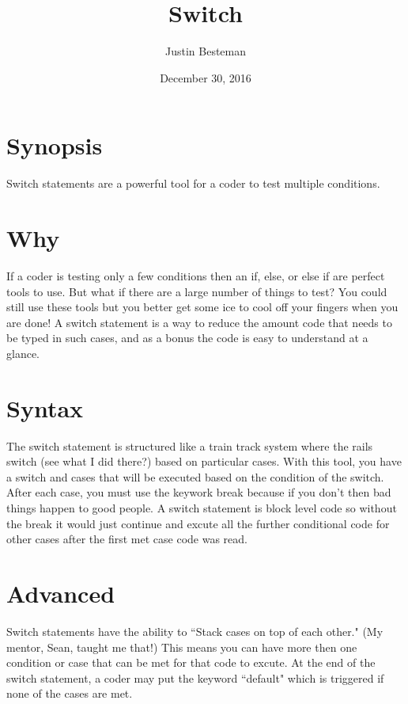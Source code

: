 \documentclass[12pt, letterpaper]{article}
\title{Switch}
\author{Justin Besteman}
\date{December 30, 2016}
\begin{document}
\maketitle


\section*{Synopsis}

Switch statements are a powerful tool for a coder to test multiple conditions.

\section*{Why}

If a coder is testing only a few conditions then an if, else, or else if are perfect tools to use. But what if there are a large number of things to test? You could still use these tools but you better get some ice to cool off your fingers when you are done! A switch statement is a way to reduce the amount code that needs to be typed in such cases, and as a bonus the code is easy to understand at a glance.

\section*{Syntax}

The switch statement is structured like a train track system where the rails switch (see what I did there?) based on particular cases. With this tool, you have a switch and cases that will be executed based on the condition of the switch. After each case, you must use the keywork break because if you don't then bad things happen to good people. A switch statement is block level code so without the break it would just continue and excute all the further conditional code for other cases after the first met case code was read.

\section*{Advanced}

Switch statements have the ability to ``Stack cases on top of each other." (My mentor, Sean, taught me that!) This means you can have more then one condition or case that can be met for that code to excute. At the end of the switch statement, a coder may put the keyword ``default" which is triggered if none of the cases are met. 
\end{document}
